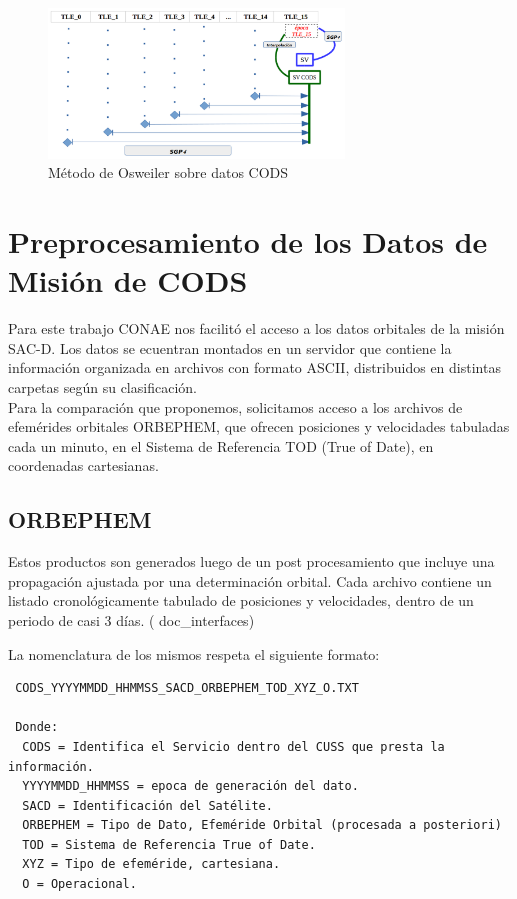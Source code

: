 \begin{figure}[!h]
 \centering
 \includegraphics[width=0.7\textwidth]{imagenes/Osweiler_sobre_Cods.png}
 \caption{M\'etodo de Osweiler sobre datos CODS}
\end{figure}

\section{Preprocesamiento de los Datos de Misi\'on de CODS}
Para este trabajo CONAE nos facilit\'o el acceso a los datos orbitales de la misi\'on SAC-D.
Los datos se ecuentran montados en un servidor que contiene la informaci\'on organizada en archivos con formato ASCII, distribuidos en distintas carpetas seg\'un su clasificaci\'on.\\
Para la comparaci\'on que proponemos, solicitamos acceso a los archivos de efem\'erides orbitales ORBEPHEM, que ofrecen posiciones y velocidades tabuladas cada un minuto, en el Sistema de Referencia TOD (True of Date), en coordenadas cartesianas.

\subsection{ORBEPHEM}
Estos productos son generados luego de un post procesamiento que incluye una propagaci\'on ajustada por una determinaci\'on orbital. 
Cada archivo contiene un listado cronol\'ogicamente tabulado de posiciones y velocidades, dentro de un periodo de casi 3 d\'ias. ( doc\_interfaces)

La nomenclatura de los mismos respeta el siguiente formato:\\
\begin{verbatim}
 CODS_YYYYMMDD_HHMMSS_SACD_ORBEPHEM_TOD_XYZ_O.TXT
 
 Donde:
  CODS = Identifica el Servicio dentro del CUSS que presta la información.
  YYYYMMDD_HHMMSS = epoca de generación del dato.
  SACD = Identificación del Satélite.
  ORBEPHEM = Tipo de Dato, Efeméride Orbital (procesada a posteriori)
  TOD = Sistema de Referencia True of Date.
  XYZ = Tipo de efeméride, cartesiana.
  O = Operacional. 
\end{verbatim}


